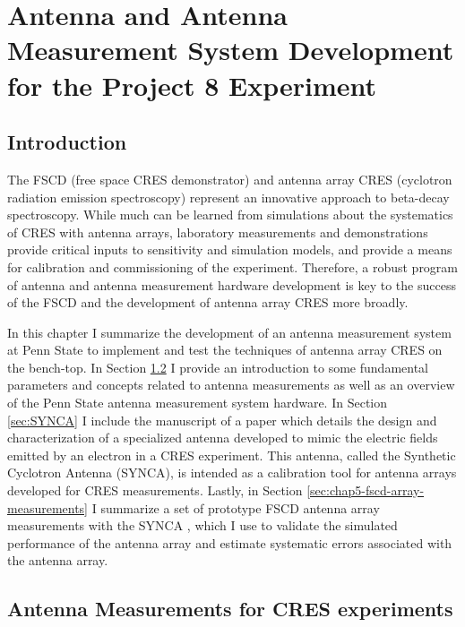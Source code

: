 

\chapter{Antenna and Antenna Measurement System Development for the Project 8 Experiment}

\section{Introduction}

The FSCD (free space CRES demonstrator) and antenna array CRES (cyclotron radiation emission spectroscopy) represent an innovative approach to beta-decay spectroscopy. While much can be learned from simulations about the systematics of CRES with antenna arrays, laboratory measurements and demonstrations provide critical inputs to sensitivity and simulation models, and provide a means for calibration and commissioning of the experiment. Therefore, a robust program of antenna and antenna measurement hardware development is key to the success of the FSCD and the development of antenna array CRES more broadly.

In this chapter I summarize the development of an antenna measurement system at Penn State to implement and test the techniques of antenna array CRES on the bench-top. In Section \ref{sec:chap4-ant-meas} I provide an introduction to some fundamental parameters and concepts related to antenna measurements as well as an overview of the Penn State antenna measurement system hardware. In Section \ref{sec:SYNCA} I include the manuscript of a paper \cite{p8synca} which details the design and characterization of a specialized antenna developed to mimic the electric fields emitted by an electron in a CRES experiment. This antenna, called the Synthetic Cyclotron Antenna (SYNCA), is intended as a calibration tool for antenna arrays developed for CRES measurements. Lastly, in Section \ref{sec:chap5-fscd-array-measurements} I summarize a set of prototype FSCD antenna array measurements with the SYNCA \cite{p8jugaad}, which I use to validate the simulated performance of the antenna array and estimate systematic errors associated with the antenna array.

\section{Antenna Measurements for CRES experiments}
\label{sec:chap4-ant-meas}

